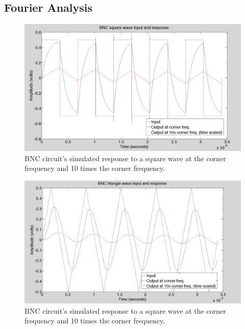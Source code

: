 \documentclass[12pt,letterpaper]{report}
\begin{document}
\subsection*{Fourier Analysis}

\begin{figure}
	\centering
	\includegraphics[width=\linewidth, keepaspectratio=true]{lab1_images/MATLAB_BNC_square.png} 
	\caption{BNC circuit's simulated response to a square wave at the corner frequency and 10 times the corner frequency.}
	\label{fig:bnc_square}
\end{figure}

\begin{figure}
	\centering
	\includegraphics[width=\linewidth, keepaspectratio=true]{lab1_images/MATLAB_BNC_triangle.png} 
	\caption{BNC circuit's simulated response to a square wave at the corner frequency and 10 times the corner frequency.}
	\label{fig:bnc_triangle}
\end{figure}
\end{document}

